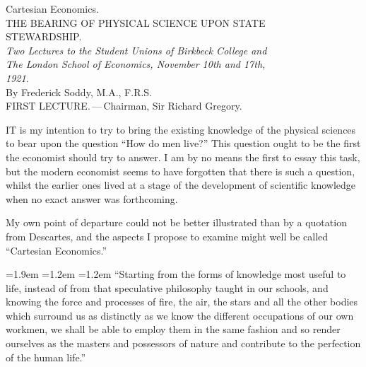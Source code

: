 \documentclass[10.5pt,twoside]{book}
\newenvironment{extract}
  {\par\addvspace{7pt}\begingroup\small\linespread{1.02}\selectfont
   \leftskip=1.9em \rightskip=1.2em \parindent=1.2em \noindent\ignorespaces}
  {\par\endgroup\addvspace{7pt}}
\begin{document}
\begin{center}
  {\fontsize{16}{20}\selectfont Cartesian Economics.}\\[13pt]
  {\footnotesize THE BEARING OF PHYSICAL SCIENCE UPON STATE\\[2pt]
   STEWARDSHIP.}\\[13pt]
  {\footnotesize\itshape Two Lectures to the Student Unions of Birkbeck College and\\
   The London School of Economics, November 10th and 17th,\\
   1921.\footnotemark}\\[9pt]
  {\footnotesize By Frederick Soddy, M.A., F.R.S.}\\[16pt]
  {\footnotesize FIRST LECTURE.\,---\,Chairman, Sir Richard Gregory.}\\[10pt]
\end{center}

\lettrine[lines=2,findent=2pt,nindent=0pt,slope=0pt]{I}{T} is my intention to
try to bring the existing knowledge of the physical sciences to bear upon the
question ``How do men live?'' This question ought to be the first the
economist should try to answer. I am by no means the first to essay this task,
but the modern economist seems to have forgotten that there is such a
question, whilst the earlier ones lived at a stage of the development of
scientific knowledge when no exact answer was forthcoming.

My own point of departure could not be better illustrated than by a quotation
from Descartes, and the aspects I propose to examine might well be called
``Cartesian Economics.''

\begin{extract}
``Starting from the forms of knowledge most useful to life, instead of from
that speculative philosophy taught in our schools, and knowing the force and
processes of fire, the air, the stars and all the other bodies which surround
us as distinctly as we know the different occupations of our own workmen, we
shall be able to employ them in the same fashion and so render ourselves as
the masters and possessors of nature and contribute to the perfection of the
human life.''
\end{extract}
\end{document}
